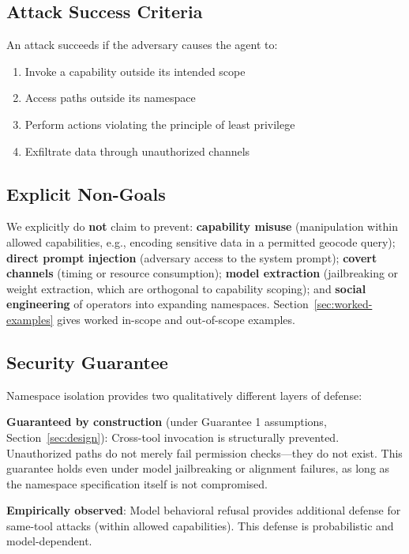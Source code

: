 \documentclass[acmsmall,screen,review]{acmart}
\begin{document}
\subsection{Attack Success Criteria}

An attack succeeds if the adversary causes the agent to:
\begin{enumerate}
    \item Invoke a capability outside its intended scope
    \item Access paths outside its namespace
    \item Perform actions violating the principle of least privilege
    \item Exfiltrate data through unauthorized channels
\end{enumerate}

\subsection{Explicit Non-Goals}
\label{sec:non-goals}

We explicitly do \textbf{not} claim to prevent: \textbf{capability misuse} (manipulation within allowed capabilities, e.g., encoding sensitive data in a permitted geocode query); \textbf{direct prompt injection} (adversary access to the system prompt); \textbf{covert channels} (timing or resource consumption); \textbf{model extraction} (jailbreaking or weight extraction, which are orthogonal to capability scoping); and \textbf{social engineering} of operators into expanding namespaces. Section~\ref{sec:worked-examples} gives worked in-scope and out-of-scope examples.

\subsection{Security Guarantee}

Namespace isolation provides two qualitatively different layers of defense:

\textbf{Guaranteed by construction} (under Guarantee 1 assumptions, Section~\ref{sec:design}): Cross-tool invocation is structurally prevented. Unauthorized paths do not merely fail permission checks---they do not exist. This guarantee holds even under model jailbreaking or alignment failures, as long as the namespace specification itself is not compromised.

\textbf{Empirically observed}: Model behavioral refusal provides additional defense for same-tool attacks (within allowed capabilities). This defense is probabilistic and model-dependent.
\end{document}
